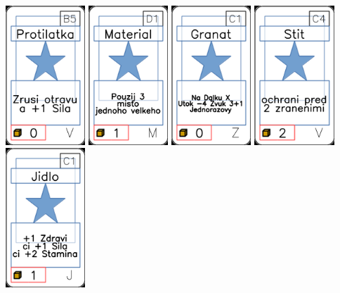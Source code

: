 \documentclass[a4paper]{article}
\begin{document}
	\includegraphics[width=3.0cm]{img-1_69}
	\includegraphics[width=3.0cm]{img-1_45}
	\includegraphics[width=3.0cm]{img-1_100}
	\includegraphics[width=3.0cm]{img-1_73}
	\includegraphics[width=3.0cm]{img-1_10}
\end{document}
